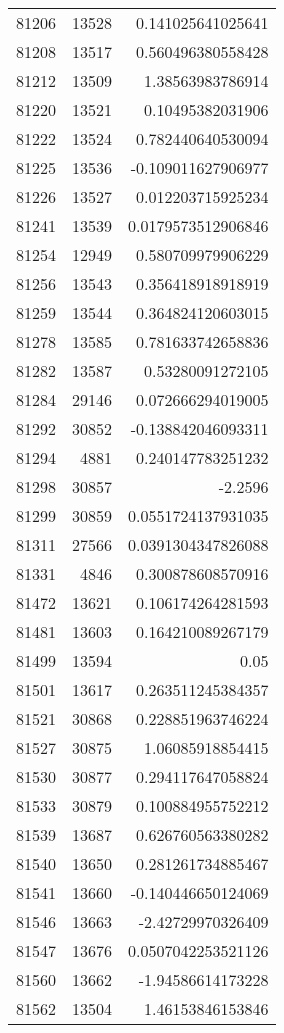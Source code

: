 \begin{tabular}{r | r | r}
81206 & 13528 & 0.141025641025641 \\
81208 & 13517 & 0.560496380558428 \\
81212 & 13509 & 1.38563983786914 \\
81220 & 13521 & 0.10495382031906 \\
81222 & 13524 & 0.782440640530094 \\
81225 & 13536 & -0.109011627906977 \\
81226 & 13527 & 0.012203715925234 \\
81241 & 13539 & 0.0179573512906846 \\
81254 & 12949 & 0.580709979906229 \\
81256 & 13543 & 0.356418918918919 \\
81259 & 13544 & 0.364824120603015 \\
81278 & 13585 & 0.781633742658836 \\
81282 & 13587 & 0.53280091272105 \\
81284 & 29146 & 0.072666294019005 \\
81292 & 30852 & -0.138842046093311 \\
81294 & 4881 & 0.240147783251232 \\
81298 & 30857 & -2.2596 \\
81299 & 30859 & 0.0551724137931035 \\
81311 & 27566 & 0.0391304347826088 \\
81331 & 4846 & 0.300878608570916 \\
81472 & 13621 & 0.106174264281593 \\
81481 & 13603 & 0.164210089267179 \\
81499 & 13594 & 0.05 \\
81501 & 13617 & 0.263511245384357 \\
81521 & 30868 & 0.228851963746224 \\
81527 & 30875 & 1.06085918854415 \\
81530 & 30877 & 0.294117647058824 \\
81533 & 30879 & 0.100884955752212 \\
81539 & 13687 & 0.626760563380282 \\
81540 & 13650 & 0.281261734885467 \\
81541 & 13660 & -0.140446650124069 \\
81546 & 13663 & -2.42729970326409 \\
81547 & 13676 & 0.0507042253521126 \\
81560 & 13662 & -1.94586614173228 \\
81562 & 13504 & 1.46153846153846 \\

\end{tabular}
